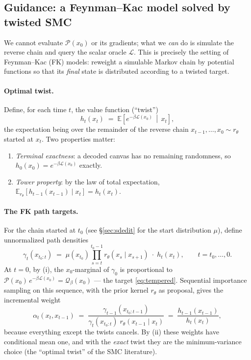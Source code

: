 \documentclass[11pt]{article}
\newcommand{\Ploss}{\mathcal{L}}
\newcommand{\Pd}{\mathcal{P}}
\newcommand{\E}{\mathbb{E}}
\begin{document}
\subsection{Guidance: a Feynman--Kac model solved by twisted SMC}
\label{sec:smc}
We cannot evaluate $\Pd(x_0)$ or its gradients; what we \emph{can} do is
simulate the reverse chain and query the scalar oracle $\Ploss$. This is
precisely the setting of Feynman--Kac (FK) models: reweight a simulable
Markov chain by potential functions so that its \emph{final} state is
distributed according to a twisted target.

\paragraph{Optimal twist.} Define, for each time $t$, the value function
(``twist'')
\begin{equation}
\label{eq:twist}
h_t(x_t) \;=\; \E\!\left[ e^{-\beta \Ploss(x_0)} \,\middle|\, x_t \right],
\end{equation}
the expectation being over the remainder of the reverse chain
$x_{t-1}, \dots, x_0 \sim r_\theta$ started at $x_t$. Two properties
matter:
\begin{enumerate}
\item[(i)] \emph{Terminal exactness}: a decoded canvas has no remaining
randomness, so $h_0(x_0) = e^{-\beta \Ploss(x_0)}$ exactly.
\item[(ii)] \emph{Tower property}: by the law of total expectation,
$\E_{r_\theta}\!\left[ h_{t-1}(x_{t-1}) \mid x_t \right] = h_t(x_t)$.
\end{enumerate}

\paragraph{The FK path targets.} For the chain started at $t_0$ (see
\S\ref{sec:sdedit} for the start distribution $\mu$), define unnormalized
path densities
\begin{equation}
\gamma_t(x_{t_0:t}) \;=\;
\mu(x_{t_0}) \prod_{s=t}^{t_0-1} r_\theta(x_{s} \mid x_{s+1})
\;\cdot\; h_t(x_t),
\qquad t = t_0, \dots, 0 .
\end{equation}
At $t{=}0$, by (i), the $x_0$-marginal of $\gamma_0$ is proportional to
$\Pd(x_0)\, e^{-\beta \Ploss(x_0)} = \mathcal{Q}_\beta(x_0)$ --- the target
\eqref{eq:tempered}. Sequential importance sampling on this sequence, with
the prior kernel $r_\theta$ as proposal, gives the incremental weight
\begin{equation}
\label{eq:incw}
\alpha_t(x_t, x_{t-1})
\;=\;
\frac{\gamma_{t-1}(x_{t_0:t-1})}
     {\gamma_{t}(x_{t_0:t})\; r_\theta(x_{t-1} \mid x_t)}
\;=\;
\frac{h_{t-1}(x_{t-1})}{h_t(x_t)} ,
\end{equation}
because everything except the twists cancels. By (ii) these weights have
conditional mean one, and with the \emph{exact} twist they are the
minimum-variance choice (the ``optimal twist'' of the SMC literature).
\end{document}
